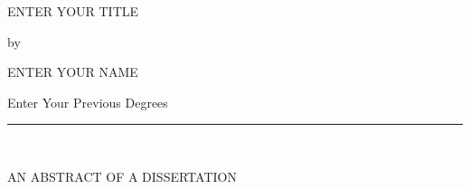 \begin{center}

   \vspace{1cm}


   \large ENTER YOUR TITLE\\

   \vspace{0.5cm}

   by\\

   \vspace{0.5cm}


   \large ENTER YOUR NAME\\

   \vspace{0.5cm}


   Enter Your Previous Degrees\\

   \vspace{0.55cm}
   \rule{2in}{0.5pt}\\
   \vspace{0.75cm}

   {\large AN ABSTRACT OF A DISSERTATION}\\


\end{center}
